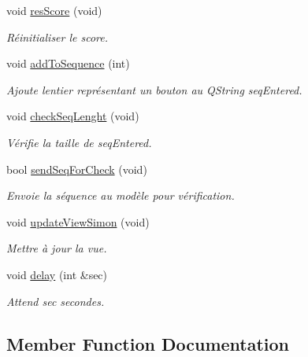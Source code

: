 \begin{DoxyCompactItemize}
\mbox{\label{class_super_simon_a9c3cccc53f6445c0bf03b30dd6528340}} 
void \hyperlink{class_super_simon_a9c3cccc53f6445c0bf03b30dd6528340}{res\+Score} (void)
\begin{DoxyCompactList}\small\item\em Réinitialiser le score. \end{DoxyCompactList}\item 
void \hyperlink{class_super_simon_aece1587ad880233a11cf24cbbe284a42}{add\+To\+Sequence} (int)
\begin{DoxyCompactList}\small\item\em Ajoute l\textquotesingle{}entier représentant un bouton au Q\+String seq\+Entered. \end{DoxyCompactList}\item 
void \hyperlink{class_super_simon_a4ea2f32b57775bd2c784472369127bcf}{check\+Seq\+Lenght} (void)
\begin{DoxyCompactList}\small\item\em Vérifie la taille de seq\+Entered. \end{DoxyCompactList}\item 
\mbox{\label{class_super_simon_a242ac18e5bcd7487bfd8a5b01b59669a}} 
bool \hyperlink{class_super_simon_a242ac18e5bcd7487bfd8a5b01b59669a}{send\+Seq\+For\+Check} (void)
\begin{DoxyCompactList}\small\item\em Envoie la séquence au modèle pour vérification. \end{DoxyCompactList}\item 
void \hyperlink{class_super_simon_a8d5c23562cd6b048720003d3c796ac7a}{update\+View\+Simon} (void)
\begin{DoxyCompactList}\small\item\em Mettre à jour la vue. \end{DoxyCompactList}\item 
void \hyperlink{class_super_simon_af12663f8a26a971a508a40a33d0afceb}{delay} (int \&sec)
\begin{DoxyCompactList}\small\item\em Attend sec secondes. \end{DoxyCompactList}\end{DoxyCompactItemize}


\subsection{Member Function Documentation}
\mbox{\label{class_super_simon_aece1587ad880233a11cf24cbbe284a42}} 
